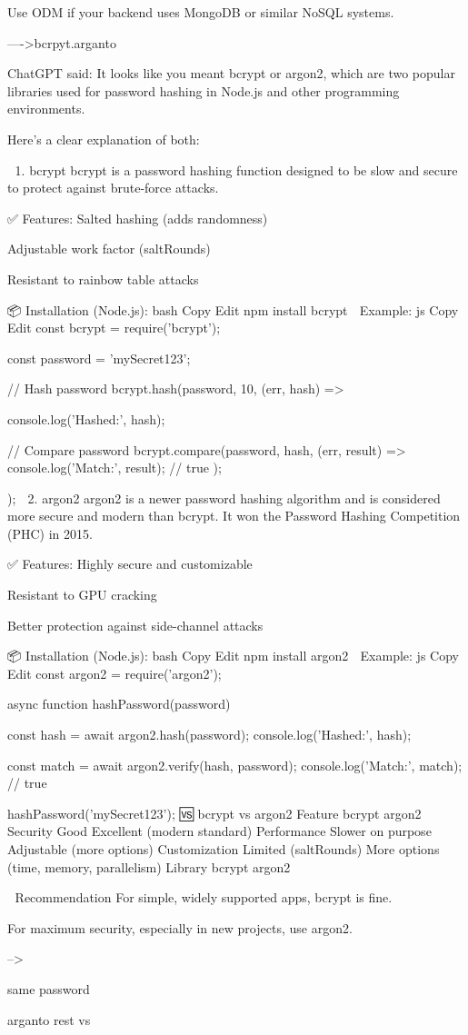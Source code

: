 Use ODM if your backend uses MongoDB or similar NoSQL systems.

---->bcrpyt.arganto


ChatGPT said:
It looks like you meant bcrypt or argon2, which are two popular libraries used for password hashing in Node.js and other programming environments.

Here’s a clear explanation of both:

🔐 1. bcrypt
bcrypt is a password hashing function designed to be slow and secure to protect against brute-force attacks.

✅ Features:
Salted hashing (adds randomness)

Adjustable work factor (saltRounds)

Resistant to rainbow table attacks

📦 Installation (Node.js):
bash
Copy
Edit
npm install bcrypt
🧾 Example:
js
Copy
Edit
const bcrypt = require('bcrypt');

const password = 'mySecret123';

// Hash password
bcrypt.hash(password, 10, (err, hash) => {
  console.log('Hashed:', hash);

  // Compare password
  bcrypt.compare(password, hash, (err, result) => {
    console.log('Match:', result); // true
  });
});
🔐 2. argon2
argon2 is a newer password hashing algorithm and is considered more secure and modern than bcrypt. It won the Password Hashing Competition (PHC) in 2015.

✅ Features:
Highly secure and customizable

Resistant to GPU cracking

Better protection against side-channel attacks

📦 Installation (Node.js):
bash
Copy
Edit
npm install argon2
🧾 Example:
js
Copy
Edit
const argon2 = require('argon2');

async function hashPassword(password) {
  const hash = await argon2.hash(password);
  console.log('Hashed:', hash);

  const match = await argon2.verify(hash, password);
  console.log('Match:', match); // true
}

hashPassword('mySecret123');
🆚 bcrypt vs argon2
Feature	bcrypt	argon2
Security	Good	Excellent (modern standard)
Performance	Slower on purpose	Adjustable (more options)
Customization	Limited (saltRounds)	More options (time, memory, parallelism)
Library	bcrypt	argon2

📌 Recommendation
For simple, widely supported apps, bcrypt is fine.

For maximum security, especially in new projects, use argon2.



-->

same password


arganto
 rest vs 